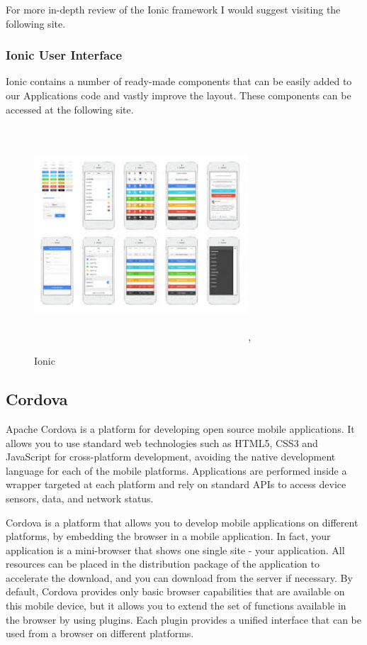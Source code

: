 \documentclass[12pt,a4paper,oneside,openany]{book}
\begin{document}
For more in-depth review of the Ionic framework I would suggest visiting the following site. \cite{ionicFrame}
\vfill{}

\subsubsection{Ionic User Interface}
Ionic contains a number of ready-made components that can be easily added to our Applications code and vastly improve the layout. These components can be accessed at the following site. \cite{ionicUI}

\begin{figure}[ht]
\renewcommand\thefigure{4.2}
\centering
\includegraphics[width=8cm, height=8cm]{Images/ionicUI.jpg},
\caption{Ionic}
\label{ionicUI}
\end{figure} 

\subsection{Cordova}
Apache Cordova is a platform for developing open source mobile applications. It allows you to use standard web technologies such as HTML5, CSS3 and JavaScript for cross-platform development, avoiding the native development language for each of the mobile platforms. Applications are performed inside a wrapper targeted at each platform and rely on standard APIs to access device sensors, data, and network status. 

Cordova is a platform that allows you to develop mobile applications on diﬀerent platforms, by embedding the browser in a mobile application. In fact, your application is a mini-browser that shows one single site - your application. All resources can be placed in the distribution package of the application to accelerate the download, and you can download from the server if necessary. By default, Cordova provides only basic browser capabilities that are available on this mobile device, but it allows you to extend the set of functions available in the browser by using plugins. Each plugin provides a uniﬁed interface that can be used from a browser on different platforms. 
\end{document}
